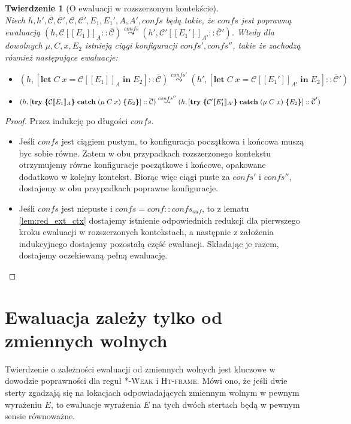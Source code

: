 \documentclass[]{pracamgr}
\renewcommand \| {\hspace{0.75em} | \hspace{0.75em} }
\renewcommand \[ {[\![}
\renewcommand \] {]\!]}
\newcommand \eval [1] {\overset{#1}{\leadsto}}
\newtheorem{theorem}{Twierdzenie}
\theoremstyle{definition}
\newcommand{\mmod}{\mu\xspace}
\newcommand{\jlet}{\mathbf{let}\xspace}
\newcommand{\jin}{\mathbf{in}\xspace}
\newcommand{\jtry}{\mathbf{try}\xspace}
\newcommand{\jcatch}{\mathbf{catch}\xspace}
\newcommand{\letin}[4]{\jlet\; #1\; #2 = #3\; \jin\; #4\xspace}
\newcommand{\tcatch}[4]{\jtry\; \boldsymbol{\{}#1\boldsymbol{\}}\; \jcatch\; (#2\; #3)\; \boldsymbol{\{}#4\boldsymbol{\}}\xspace}
\newcommand{\ctxt}{\mathcal{C}\xspace}
\newcommand{\ctxts}{\overline{\ctxt}}
\begin{document}
\begin{theorem}[O ewaluacji w rozszerzonym kontekście]{\ } \\
\label{th:eval_ext_ctx}
Niech $h, h', \ctxts, \ctxts', \ctxt, \ctxt', E_1, E_1', A, A', confs$ będą takie, że
$confs$ jest poprawną ewaluacją
$(h, \ctxt \[ E_1 \]_A :: \ctxts) \eval{confs} (h', \ctxt' \[ E_1' \]_{A'} :: \ctxts')$.
Wtedy dla dowolnych $\mmod, C, x, E_2$ istnieją ciągi konfiguracji $confs', confs''$, takie że
zachodzą również następujące ewaluacje:
\begin{itemize}
 \item $(h, [ \letin{C}{x}{\ctxt \[ E_1 \]_A}{E_2}] :: \ctxts) \eval{confs'}
        (h', [ \letin{C}{x}{\ctxt \[ E_1'\]_{A'}}{E_2}] :: \ctxts')$
 \item $(h, [ \tcatch{\ctxt \[ E_1 \]_A}{\mmod\; C}{x}{E_2}] :: \ctxts) \eval{confs''} \\
        (h, [ \tcatch{\ctxt' \[ E_1' \]_{A'}}{\mmod\; C}{x}{E_2}] :: \ctxts')$
\end{itemize}
\end{theorem}
\begin{proof}
Przez indukcję po długości $confs$.
\begin{itemize}
 \item Jeśli $confs$ jest ciągiem pustym, to konfiguracja początkowa i końcowa muszą byc sobie równe.
 Zatem w obu przypadkach rozszerzonego kontekstu otrzymujemy równe konfiguracje początkowe i końcowe,
 opakowane dodatkowo w kolejny kontekst. Biorąc więc ciągi puste za $confs'$ i $confs''$,
 dostajemy w obu przypadkach poprawne konfiguracje.
 \item Jeśli $confs$ jest niepuste i $confs = conf::confs_{suf}$, to z lematu \ref{lem:red_ext_ctx}
 dostajemy istnienie odpowiednich redukcji dla pierwszego kroku ewaluacji w rozszerzonych kontekstach,
 a następnie z założenia indukcyjnego dostajemy pozostałą część ewaluacji.
 Składając je razem, dostajemy oczekiewaną pełną ewaluację.
\end{itemize}
\end{proof}

\section{Ewaluacja zależy tylko od zmiennych wolnych}
Twierdzenie o zależności ewaluacji od zmiennych wolnych jest kluczowe w dowodzie poprawności dla
reguł \textsc{*-Weak} i \textsc{Ht-frame}.
Mówi ono, że jeśli dwie sterty zgadzają się na lokacjach odpowiadających zmiennym wolnym w pewnym wyrażeniu $E$,
to ewaluacje wyrażenia $E$ na tych dwóch stertach będą w pewnym sensie równoważne.
\end{document}
